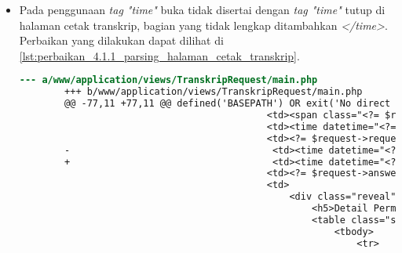 \begin{itemize}
    \item Pada penggunaan \textit{tag "time"} buka tidak disertai dengan \textit{tag "time"} tutup di halaman cetak transkrip, bagian yang tidak lengkap ditambahkan \textit{</time>}. Perbaikan yang dilakukan dapat dilihat di \ref{lst:perbaikan_4.1.1_parsing_halaman_cetak_transkrip}.
    \begin{lstlisting}[frame=single, label={lst:perbaikan_4.1.1_parsing_halaman_cetak_transkrip}, language=diff, caption=Perbaikan Kriteria Sukses 4.1.1 - Kesalahan Elemen pada Halaman Cetak Transkrip]
        --- a/www/application/views/TranskripRequest/main.php
        +++ b/www/application/views/TranskripRequest/main.php
        @@ -77,11 +77,11 @@ defined('BASEPATH') OR exit('No direct script access allowed');
                                            <td><span class="<?= $request->labelClass ?> label"><?= $request->status ?></span></td>
                                            <td><time datetime="<?= $request->requestDateTime ?>"><?= $request->requestDateString ?></time></td>
                                            <td><?= $request->requestType ?></td>
        -                                    <td><time datetime="<?= $request->answeredDateTime ?>"><?= $request->answeredDateString ?></td>
        +                                    <td><time datetime="<?= $request->answeredDateTime ?>"><?= $request->answeredDateString ?></time></td>
                                            <td><?= $request->answeredMessage ?></td>
                                            <td>
                                                <div class="reveal" id="detail<?= $request->id ?>" data-reveal>
                                                    <h5>Detail Permohonan #<?= $request->id ?></h5>
                                                    <table class="stack">
                                                        <tbody>
                                                            <tr>
    \end{lstlisting} 


\end{itemize}

